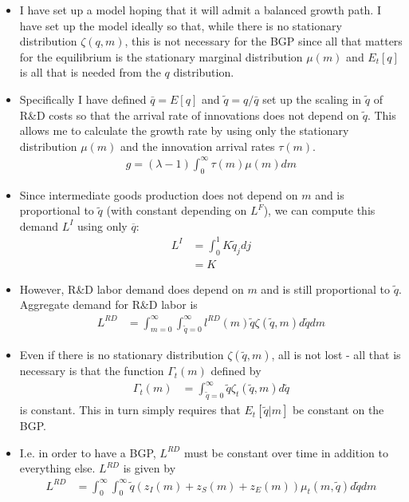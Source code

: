 \documentclass[12pt,english]{article}
\theoremstyle{remark}
\begin{document}
\begin{itemize}
	\item I have set up a model hoping that it will admit a balanced growth path. I have set up the model ideally so that, while there is no stationary distribution $\zeta(q,m)$, this is not necessary for the BGP since all that matters for the equilibrium is the stationary marginal distribution $\mu(m)$ and $E_t[q]$ is all that is needed from the $q$ distribution. 
	\item Specifically I have defined $\bar{q} = E[q]$ and $\tilde{q} = q / \bar{q}$ set up the scaling in $\tilde{q}$ of R\&D costs so that the arrival rate of innovations does not depend on $\tilde{q}$. This allows me to calculate the growth rate by using only the stationary distribution $\mu(m)$ and the innovation arrival rates $\tau(m)$. 
	\begin{align*}
		g = (\lambda - 1) \int_0^{\infty} \tau(m) \mu(m) dm 
	\end{align*}
	\item Since intermediate goods production does not depend on $m$ and is proportional to $\tilde{q}$ (with constant depending on $L^F$), we can compute this demand $L^I$ using only $\overline{q}$: 
	\begin{align*}
		L^I &= \int_{0}^{1} K \tilde{q}_j dj \\ 
		    &= K 
	\end{align*} 
	\item However, R\&D labor demand does depend on $m$ and is still proportional to $\tilde{q}$. Aggregate demand for R\&D labor is 
	\begin{align*}
		L^{RD} &= \int_{m=0}^{\infty} \int_{\tilde{q}=0}^{\infty} l^{RD} (m) \tilde{q} \zeta(\tilde{q},m) d\tilde{q}dm 
	\end{align*}
	\item Even if there is no stationary distribution $\zeta(\tilde{q},m)$, all is not lost - all that is necessary is that the function $\Gamma_t(m)$ defined by 
	\begin{align*}
		\Gamma_t(m) &= \int_{\tilde{q}=0}^{\infty} \tilde{q} \zeta_t(\tilde{q},m) d\tilde{q}
	\end{align*}
	is constant. This in turn simply requires that $E_t [\tilde{q} | m]$ be constant on the BGP. 
	\item I.e. in order to have a BGP, $L^{RD}$ must be constant over time in addition to everything else. $L^{RD}$ is given by 
	\begin{align*}
		L^{RD} &= \int_0^{\infty} \int_0^{\infty} \tilde{q}(z_I(m) + z_S(m) + z_E(m)) \mu_t(m,\tilde{q}) d\tilde{q} dm \\

\end{align*}
\end{itemize}
\end{document}
